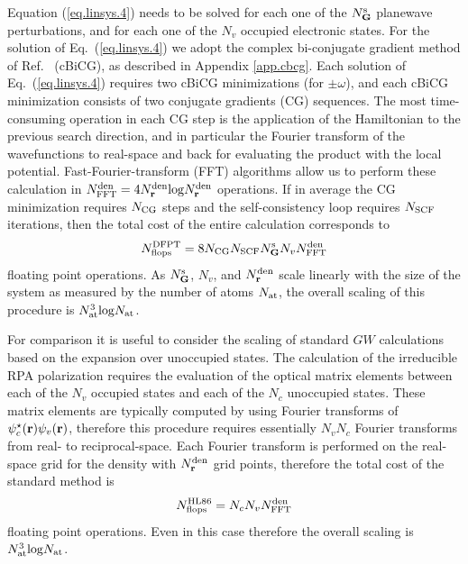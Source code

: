 \documentclass[twocolumn,prb,showpacs,superscriptaddress]{revtex4}
\def\w{\omega}
\def\G{{\bf G}}
\def\r{{\bf r}}
\begin{document}
Equation (\ref{eq.linsys.4}) needs to be solved for each one of the $N_\G^{\rm s}$ planewave perturbations,
and for each one of the $N_v$ occupied electronic states. For the solution
of Eq.~(\ref{eq.linsys.4}) we adopt the complex bi-conjugate gradient method
of Ref.\  (cBiCG), as described in Appendix \ref{app.cbcg}.
Each solution of Eq.\ (\ref{eq.linsys.4}) requires two cBiCG minimizations
(for $\pm\w$), and each cBiCG minimization consists of two conjugate gradients (CG) sequences.
The most time-consuming operation in each CG step is the application of the Hamiltonian 
to the previous search direction, and in particular
the Fourier transform of the wavefunctions to real-space and back for evaluating
the product with the local potential. Fast-Fourier-transform (FFT)
algorithms allow us to perform these calculation in $N^{\rm den}_{\rm FFT} = 4 N_\r^{\rm den} {\rm log} N_\r^{\rm den}$ operations.\cite{frigo}
If in average the CG minimization requires $N_{\rm CG}$ steps
and the self-consistency loop requires $N_{\rm SCF}$ iterations,
then the total cost of the entire calculation corresponds to
   \begin{equation}\label{eq.scaling.1}
   N^{\rm DFPT}_{\rm flops} = 8 N_{\rm CG} N_{\rm SCF} N_\G^{\rm s}  N_v N^{\rm den}_{\rm FFT}
   \end{equation}
floating point operations.
As $N_\G^{\rm s}$, $N_v$, and $N_\r^{\rm den}$ scale linearly with the size of the system
as measured by the number of atoms $N_{\rm at}$,
the overall scaling of this procedure is $N_{\rm at}^3 {\rm log} N_{\rm at}$.

For comparison it is useful to consider the scaling of standard $GW$ calculations
based on the expansion over unoccupied states.\cite{hl86} 
The calculation of the irreducible RPA polarization requires the evaluation of the 
optical matrix elements between each of the $N_v$ occupied states and each of the $N_c$ unoccupied states.
These matrix elements are typically computed by using Fourier transforms of $\psi_c^\star(\r)\psi_v(\r)$,
therefore this procedure requires essentially $N_v N_c$ Fourier transforms from real- to reciprocal-space.
Each Fourier transform is performed on the real-space grid for the density with $N_\r^{\rm den}$ grid points, 
therefore the total cost of the standard method is
   \begin{equation}\label{eq.scaling.2}
   N^{\rm HL86}_{\rm flops} = N_c  N_v N^{\rm den}_{\rm FFT}
   \end{equation}
floating point operations.
Even in this case therefore the overall scaling is $N_{\rm at}^3 {\rm log} N_{\rm at}$.
\end{document}

